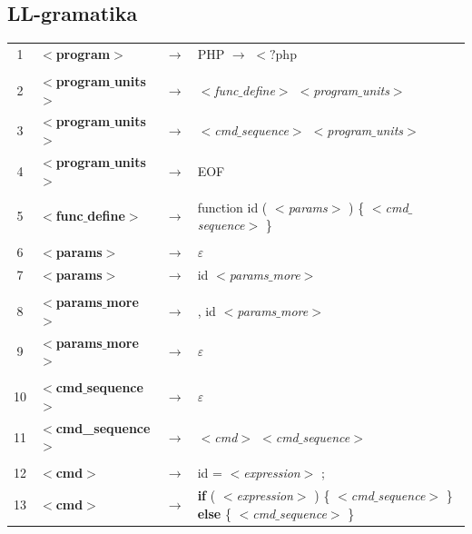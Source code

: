 \documentclass[11pt,a4paper,titlepage]{article}
\begin{document}
		\subsection{LL-gramatika}
			\begin{center}
  		\begin{tabular}{c l c l} 
				 	1&\textbf{$<$program$>$} & $\rightarrow$ & PHP $\rightarrow$ $<?$php \\ 
				 	& & & \\ 
					2&\textbf{$<$program$\_$units$>$}   &   	$\rightarrow$      &     \emph{$<$func$\_$define$>$ $<$program$\_$units$>$}  \\ 
					3&\textbf{$<$program$\_$units$>$}   &   	$\rightarrow$      &     \emph{$<$cmd$\_$sequence$>$ $<$program$\_$units$>$} \\  
					4&\textbf{$<$program$\_$units$>$}   &    	$\rightarrow$      &     EOF      \\  
 				  & & & \\ 
					5&\textbf{$<$func$\_$define$>$}     &  		$\rightarrow$      &     function id ( \emph{$<$params$>$} ) \{ \emph{$<$cmd$\_$sequence$>$} \} \\ 
					& & & \\ 
					6&\textbf{$<$params$>$}           &    	$\rightarrow$      &     $\varepsilon$\\                                         
					7&\textbf{$<$params$>$}           &      	$\rightarrow$      &     \textdollar id \emph{$<$params$\_$more$>$ } \\ 
	  			& & &  \\ 
					8&\textbf{$<$params$\_$more$>$}     &   		$\rightarrow$      &     , \textdollar id \emph{$<$params$\_$more$>$} \\ 
					9&\textbf{$<$params$\_$more$>$}     &   		$\rightarrow$      &     $\varepsilon$   \\                     
					& & & \\ 
					10&\textbf{$<$cmd$\_$sequence$>$} 	 &   		$\rightarrow$      &     $\varepsilon$     \\                       
					11&\textbf{$<$cmd\_sequence$>$}    &   		$\rightarrow$      &     \emph{$<$cmd$>$ $<$cmd$\_$sequence$>$}  \\ 
 	 				& & &  \\ 
					12&\textbf{$<$cmd$>$}             &       $\rightarrow$      &     \textdollar id = \emph{$<$expression$>$} ;\\ 
					13&\textbf{$<$cmd$>$}             &    $\rightarrow$      &     \textbf{if} ( \emph{$<$expression$>$} ) \{ \emph{$<$cmd$\_$sequence$>$} \} \textbf{else} \{ \emph{$<$cmd$\_$sequence$>$} \} \\        	

\end{tabular}
\end{center}
\end{document}
